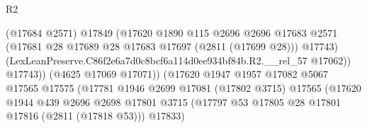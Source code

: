 \begin{lexlean}{R2}
\begin{coremodule}
                                              (@17684 @2571)
                                              @17849
                                              (@17620
                                                @1890
                                                @115
                                                @2696
                                                @2696
                                                @17683
                                                @2571
                                                (@17681
                                                  @28
                                                  @17689
                                                  @28
                                                  @17683
                                                  @17697
                                                  (@2811 (@17699 @28)))
                                                @17743)
                                              (LexLeanPreserve.C86f2e6a7d0c8bcf6a114d0ee934bf84b.R2.__rel_57
                                                @17062))
                                            @17743))
                                        (@4625 @17069 @17071))
                                      (@17620
                                        @1947
                                        @1957
                                        @17082
                                        @5067
                                        @17565
                                        @17575
                                        (@17781
                                          @1946
                                          @2699
                                          @17081
                                          (@17802 @3715)
                                          @17565
                                          (@17620
                                            @1944
                                            @439
                                            @2696
                                            @2698
                                            @17801
                                            @3715
                                            (@17797
                                              @53
                                              @17805
                                              @28
                                              @17801
                                              @17816
                                              (@2811 (@17818 @53)))
                                            @17833)

\end{coremodule}
\end{lexlean}
